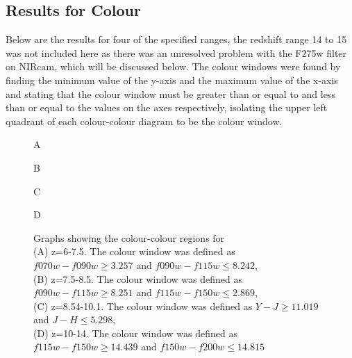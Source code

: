 	\subsection{Results for Colour} %
	\label{sub:Results_for_Colour}
		Below are the results for four of the specified ranges, the redshift range 14 to 15 was not included here as there was an unresolved problem with the F275w filter on NIRcam, which will be discussed below. The colour windows were found by finding the minimum value of the y-axis and the maximum value of the x-axis and stating that the colour window must be greater than or equal to and less than or equal to the values on the axes respectively, isolating the upper left quadrant of each colour-colour diagram to be the colour window.
		\begin{figure}[htbp]
			\begin{minipage}[c]{0.5\linewidth}
				\centering
					\begingroup{}
						\resizebox{\textwidth}{!}{%
							
						}\endgroup
				\caption{A\label{fig:col1}}
			\end{minipage}
			\begin{minipage}[c]{0.5\linewidth}
				\centering
					\begingroup{}
						\resizebox{\textwidth}{!}{%
							
						}\endgroup
				\caption{B\label{fig:col2}}
			\end{minipage}
			\begin{minipage}[c]{0.5\linewidth}
				\centering
					\begingroup{}
						\resizebox{\textwidth}{!}{%
							
						}\endgroup
				\caption{C\label{fig:col3}}
			\end{minipage}
			\begin{minipage}[c]{0.5\linewidth}
				\centering
					\begingroup{}
						\resizebox{\textwidth}{!}{%
							
						}\endgroup
				\caption{D\label{fig:col4}}
			\end{minipage}
			\caption{Graphs showing the colour-colour regions for \\
			(A) z=6-7.5. The colour window was defined as $f070w-f090w{\ge}3.257$ and $f090w-f115w{\le}8.242$,\\
			(B) z=7.5-8.5. The colour window was defined as $f090w-f115w{\ge}8.251$ and $f115w-f150w{\le}2.869$, \\
			(C) z=8.54-10.1. The colour window was defined as $Y-J{\ge}11.019$ and $J-H{\le}5.298$, \\
			(D) z=10-14. The colour window was defined as $f115w-f150w{\ge}14.439$ and $f150w-f200w{\le}14.815$}
		\end{figure}

